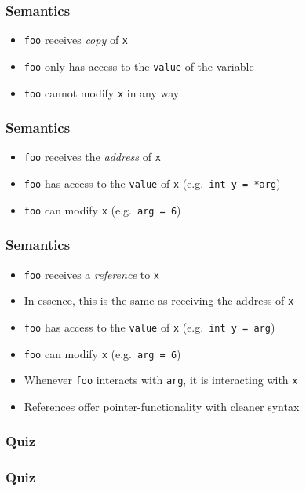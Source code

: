 \begin{frame}
  \frametitle{Semantics}
  \begin{itemize}
    \item {\tt foo} receives \emph{copy} of {\tt x}
    \item {\tt foo} only has access to the {\tt value} of the variable
    \item {\tt foo} cannot modify {\tt x} in any way
  \end{itemize}
\end{frame}

\begin{frame}
  \frametitle{Semantics}
  \begin{itemize}
    \item {\tt foo} receives the \emph{address} of {\tt x}
    \item {\tt foo} has access to the {\tt value} of {\tt x} (e.g.\ {\tt int y = *arg})
    \item {\tt foo} can modify {\tt x} (e.g.\ {\tt *arg = 6})
  \end{itemize}
\end{frame}

\begin{frame}
  \frametitle{Semantics}
  \begin{itemize}
    \item {\tt foo} receives a \emph{reference} to {\tt x}
    \item In essence, this is the same as receiving the address of {\tt x}
    \item {\tt foo} has access to the {\tt value} of {\tt x} (e.g.\ {\tt int y = arg})
    \item {\tt foo} can modify {\tt x} (e.g.\ {\tt arg = 6})
    \item Whenever {\tt foo} interacts with {\tt arg}, it is interacting with {\tt x}
    \item References offer pointer-functionality with cleaner syntax
  \end{itemize}
\end{frame}

\begin{frame}
  \frametitle{Quiz}
\end{frame}

\begin{frame}
  \frametitle{Quiz}
\end{frame}

